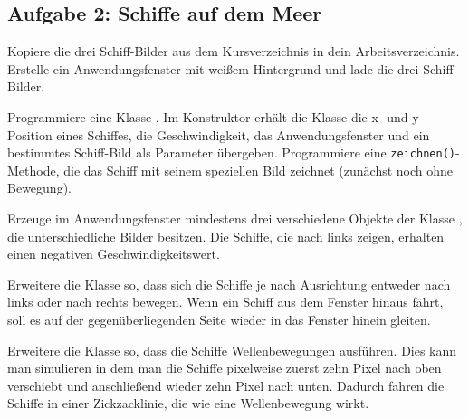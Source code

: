 \subsection{Aufgabe 2: Schiffe auf dem Meer}

\begin{compactenum}[a)]
\item Kopiere die drei Schiff-Bilder aus dem Kursverzeichnis in dein
Arbeitsverzeichnis. Erstelle ein Anwendungsfenster mit weißem Hintergrund und
lade die drei Schiff-Bilder.

Programmiere eine Klasse . Im Konstruktor erhält die Klasse die
x- und y-Position eines Schiffes, die Geschwindigkeit, das Anwendungsfenster
und ein bestimmtes Schiff-Bild als Parameter übergeben. Programmiere eine
\lstinline|zeichnen()|-Methode, die das Schiff mit seinem speziellen Bild
zeichnet (zunächst noch ohne Bewegung).

Erzeuge im Anwendungsfenster mindestens drei verschiedene Objekte der Klasse
, die unterschiedliche Bilder besitzen. Die Schiffe, die nach
links zeigen, erhalten einen negativen Geschwindigkeitswert.

\item Erweitere die Klasse  so, dass sich die Schiffe je nach
Ausrichtung entweder nach links oder nach rechts bewegen. Wenn ein Schiff aus
dem Fenster hinaus fährt, soll es auf der gegenüberliegenden Seite wieder in
das Fenster hinein gleiten.

\item Erweitere die Klasse  so, dass die Schiffe
Wellenbewegungen ausführen. Dies kann man simulieren in dem man die Schiffe
pixelweise zuerst zehn Pixel nach oben verschiebt und anschließend wieder zehn
Pixel nach unten. Dadurch fahren die Schiffe in einer Zickzacklinie, die wie
eine Wellenbewegung wirkt.
\end{compactenum}

